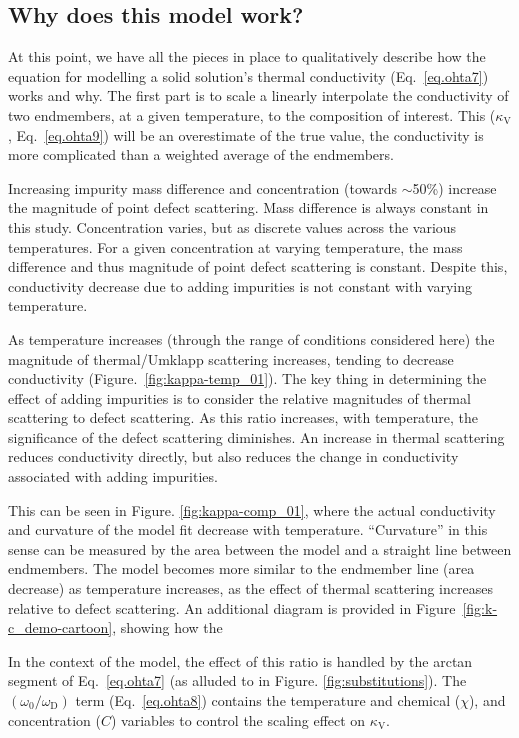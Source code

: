 \subsection{Why does this model work?}


At this point, we have all the pieces in place to qualitatively describe how the equation for modelling a solid solution's thermal conductivity (Eq.~\ref{eq.ohta7}) works and why. The first part is to scale a linearly interpolate the conductivity of two endmembers, at a given temperature, to the composition of interest. This ($\kappa_{\mathrm{V}}$, Eq.~\ref{eq.ohta9}) will be an overestimate of the true value, the conductivity is more complicated than a weighted average of the endmembers. 

Increasing impurity mass difference and concentration (towards $\sim$50\%) increase the magnitude of point defect scattering. Mass difference is always constant in this study. Concentration varies, but as discrete values across the various temperatures. For a given concentration at varying temperature, the mass difference and thus magnitude of point defect scattering is constant. Despite this, conductivity decrease due to adding impurities is not constant with varying temperature.

As temperature increases (through the range of conditions considered here) the magnitude of thermal/Umklapp scattering increases, tending to decrease conductivity (Figure.~\ref{fig:kappa-temp_01}). The key thing in determining the effect of adding impurities is to consider the relative magnitudes of thermal scattering to defect scattering. As this ratio increases, with temperature, the significance of the defect scattering diminishes. An increase in thermal scattering reduces conductivity directly, but also reduces the change in conductivity associated with adding impurities.

This can be seen in Figure. \ref{fig:kappa-comp_01}, where the actual conductivity and curvature of the model fit decrease with temperature. ``Curvature'' in this sense can be measured by the area between the model and a straight line between endmembers. The model becomes more similar to the endmember line (area decrease) as temperature increases, as the effect of thermal scattering increases relative to defect scattering. An additional diagram is provided in Figure~\ref{fig:k-c_demo-cartoon}, showing how the

In the context of the model, the effect of this ratio is handled by the arctan segment of Eq.~\ref{eq.ohta7} (as alluded to in Figure. \ref{fig:substitutions}). The $(\omega_{\mathrm{0}}/\omega_{\mathrm{D}})$ term (Eq.~\ref{eq.ohta8}) contains the temperature and chemical ($\chi$), and concentration ($C$) variables to control the scaling effect on $\kappa_{\mathrm{V}}$.

